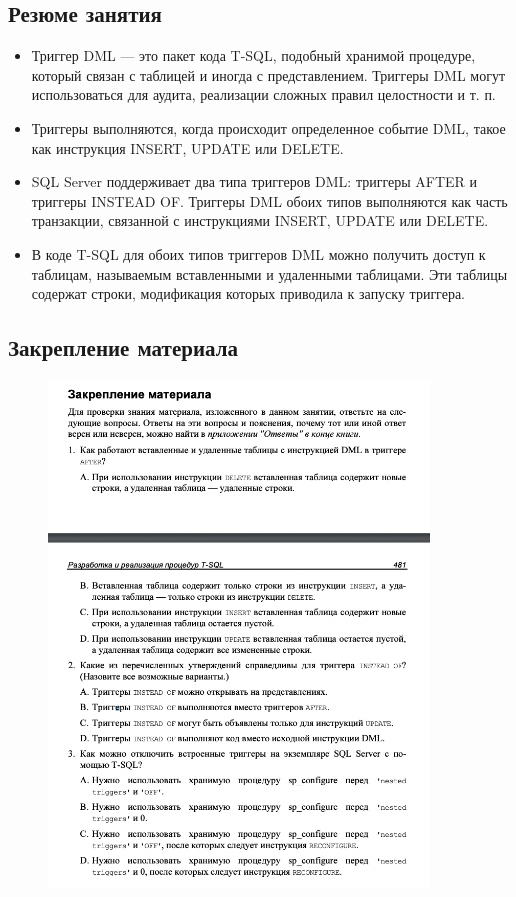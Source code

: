 		
\subsection*{Резюме занятия}
\begin{itemize}
\item Триггер DML — это пакет кода T-SQL, подобный хранимой процедуре, который
связан с таблицей и иногда с представлением. Триггеры DML могут использоваться для аудита, реализации сложных правил целостности и т. п. 
\item Триггеры выполняются, когда происходит определенное событие DML, такое
как инструкция INSERT, UPDATE или DELETE. 
\item SQL Server поддерживает два типа триггеров DML: триггеры AFTER и триггеры
INSTEAD OF. Триггеры DML обоих типов выполняются как часть транзакции, связанной с инструкциями INSERT, UPDATE или DELETE. 
\item В коде T-SQL для обоих типов триггеров DML можно получить доступ к таблицам, называемым вставленными и удаленными таблицами. Эти таблицы содержат строки, модификация которых приводила к запуску триггера. 
\end{itemize}



\subsection*{Закрепление материала}

\begin{figure}[h!]
	\begin{center}
		\includegraphics[width=0.9\textwidth]{img/zakrep31.png}
	\end{center}
	\captionsetup{justification=centering}
\end{figure}
\clearpage

